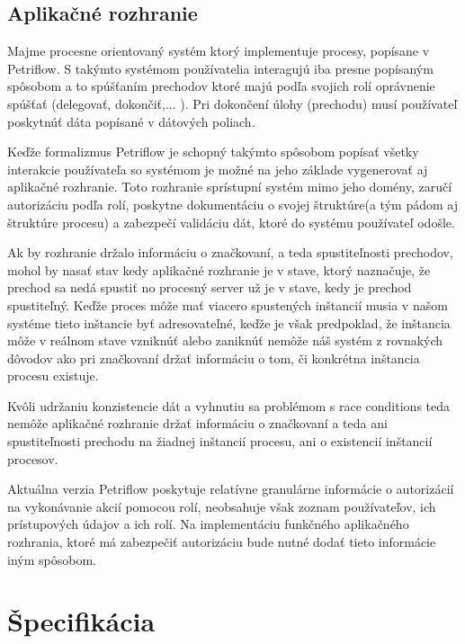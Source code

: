 \subsection{Aplikačné rozhranie}

Majme procesne orientovaný systém ktorý implementuje procesy, popísane v Petriflow. S takýmto systémom používatelia interagujú iba presne popísaným spôsobom a to spúšťaním prechodov ktoré majú podľa svojich rolí oprávnenie spúšťať (delegovať, dokončiť,... ). Pri dokončení úlohy (prechodu) musí používateľ poskytnúť dáta popísané v dátových poliach.

Keďže formalizmus Petriflow je schopný takýmto spôsobom popísať všetky interakcie používateľa so systémom je možné na jeho základe vygenerovať aj aplikačné rozhranie. Toto rozhranie sprístupní systém mimo jeho domény, zaručí autorizáciu podľa rolí, poskytne dokumentáciu o svojej štruktúre(a tým pádom aj štruktúre procesu) a zabezpečí validáciu dát, ktoré do systému používateľ odošle.

Ak by rozhranie držalo informáciu o značkovaní, a teda spustiteľnosti prechodov, mohol by nasať stav kedy aplikačné rozhranie je v stave, ktorý naznačuje, že prechod sa nedá spustiť no procesný server už je v stave, kedy je prechod spustiteľný. Keďže proces môže mať viacero spustených inštancií musia v našom systéme tieto inštancie byť adresovateľné, keďže je však predpoklad, že inštancia môže v reálnom stave vzniknúť alebo zaniknúť nemôže náš systém z rovnakých dôvodov ako pri značkovaní držať informáciu o tom, či konkrétna inštancia procesu existuje. 

Kvôli udržaniu konzistencie dát a vyhnutiu sa problémom s race conditions teda nemôže aplikačné rozhranie držať informáciu o značkovaní a teda ani spustiteľnosti prechodu na žiadnej inštancií procesu, ani o existencií inštancií procesov.

Aktuálna verzia Petriflow poskytuje relatívne granulárne informácie o autorizácií na vykonávanie akcií pomocou rolí, neobsahuje však zoznam používateľov, ich prístupových údajov a ich rolí. Na implementáciu funkčného aplikačného rozhrania, ktoré má zabezpečiť autorizáciu bude nutné dodať tieto informácie iným spôsobom.


\section{Špecifikácia}

